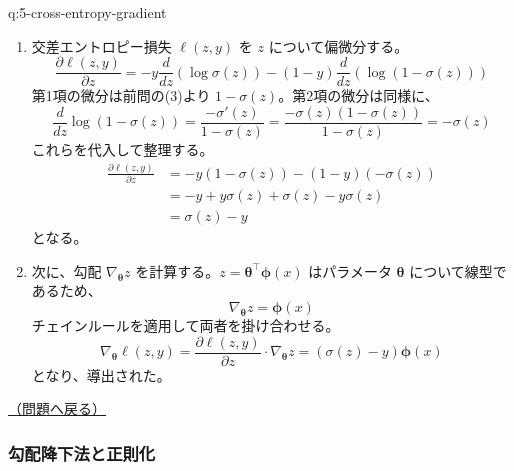 \documentclass[
  pandoc]{bxjsarticle}
\begin{document}
\begin{answerbox}[phantomlabel=a:5-cross-entropy-gradient]{q:5-cross-entropy-gradient}

\begin{enumerate}
\def\labelenumi{\arabic{enumi}.}
\item
  交差エントロピー損失 \(\ell(z, y)\) を \(z\) について偏微分する。 \[
  \frac{\partial \ell(z, y)}{\partial z} = -y \frac{d}{dz}(\log \sigma(z)) - (1-y) \frac{d}{dz}(\log(1 - \sigma(z)))
  \] 第1項の微分は前問の(3)より \(1 - \sigma(z)\)。第2項の微分は同様に、
  \[
  \frac{d}{dz} \log(1 - \sigma(z)) = \frac{-\sigma'(z)}{1 - \sigma(z)} = \frac{-\sigma(z)(1 - \sigma(z))}{1 - \sigma(z)} = -\sigma(z)
  \] これらを代入して整理する。 \begin{align*}
  \frac{\partial \ell(z, y)}{\partial z} &= -y(1 - \sigma(z)) - (1-y)(-\sigma(z)) \\
  &= -y + y\sigma(z) + \sigma(z) - y\sigma(z) \\
  &= \sigma(z) - y
  \end{align*} となる。
\item
  次に、勾配 \(\nabla_{\boldsymbol{\theta}} z\)
  を計算する。\(z = \boldsymbol{\theta}^\top \boldsymbol{\phi}(x)\)
  はパラメータ \(\boldsymbol{\theta}\) について線型であるため、 \[
  \nabla_{\boldsymbol{\theta}} z = \boldsymbol{\phi}(x)
  \] チェインルールを適用して両者を掛け合わせる。 \[
  \nabla_{\boldsymbol{\theta}} \ell(z, y) = \frac{\partial \ell(z, y)}{\partial z} \cdot \nabla_{\boldsymbol{\theta}} z = (\sigma(z) - y)\boldsymbol{\phi}(x)
  \] となり、導出された。
\end{enumerate}

\hfill 

\hyperref[q:5-cross-entropy-gradient]{（問題へ戻る）}

\end{answerbox}

\subsubsection{勾配降下法と正則化}\label{ux52feux914dux964dux4e0bux6cd5ux3068ux6b63ux5247ux5316-1}
\end{document}
